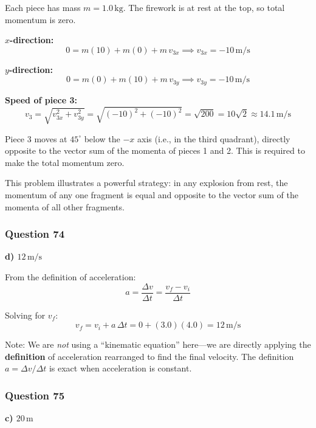 \documentclass[12pt,letterpaper]{article}
\begin{document}
\begin{explanationbox}
Each piece has mass $m = 1.0\,\text{kg}$. The firework is at rest at the top, so total momentum is zero.

\textbf{$x$-direction:}
\[
0 = m(10) + m(0) + m\,v_{3x} \implies v_{3x} = -10\,\text{m/s}
\]

\textbf{$y$-direction:}
\[
0 = m(0) + m(10) + m\,v_{3y} \implies v_{3y} = -10\,\text{m/s}
\]

\textbf{Speed of piece 3:}
\[
v_3 = \sqrt{v_{3x}^2 + v_{3y}^2} = \sqrt{(-10)^2 + (-10)^2} = \sqrt{200} = 10\sqrt{2} \approx 14.1\,\text{m/s}
\]

Piece 3 moves at $45^\circ$ below the $-x$ axis (i.e., in the third quadrant), directly opposite to the vector sum of the momenta of pieces 1 and 2. This is required to make the total momentum zero.

This problem illustrates a powerful strategy: in any explosion from rest, the momentum of any one fragment is equal and opposite to the vector sum of the momenta of all other fragments.
\end{explanationbox}

\subsubsection*{Question 74}

\begin{answerbox}
\textbf{d) $12\,\text{m/s}$}
\end{answerbox}

\begin{explanationbox}
From the definition of acceleration:
\[
a = \frac{\Delta v}{\Delta t} = \frac{v_f - v_i}{\Delta t}
\]

Solving for $v_f$:
\[
v_f = v_i + a\,\Delta t = 0 + (3.0)(4.0) = 12\,\text{m/s}
\]

Note: We are \emph{not} using a ``kinematic equation'' here---we are directly applying the \textbf{definition} of acceleration rearranged to find the final velocity. The definition $a = \Delta v/\Delta t$ is exact when acceleration is constant.
\end{explanationbox}

\subsubsection*{Question 75}

\begin{answerbox}
\textbf{c) $20\,\text{m}$}
\end{answerbox}
\end{document}
